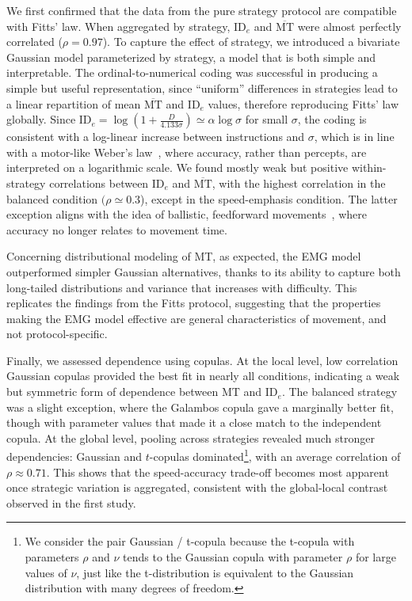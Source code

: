 \documentclass[acmlarge, manuscript,review]{acmart}
\newcommand{\mmt}{\ensuremath{\overline{\mt}}\xspace}
\newcommand{\mt}{\ensuremath{{\text{MT}}}\xspace}
\newcommand{\ide}{\ensuremath{{\text{ID}_e}}\xspace}
\begin{document}
We first confirmed that the data from the pure strategy protocol are compatible with Fitts' law. When aggregated by strategy, \ide and \mmt were almost perfectly correlated ($\rho = 0.97$). To capture the effect of strategy, we introduced a bivariate Gaussian model parameterized by strategy, a model that is both simple and interpretable.  The ordinal-to-numerical coding was successful in producing a simple but useful representation, since ``uniform'' differences in strategies lead to a linear repartition of mean \mmt and \ide values, therefore reproducing Fitts' law globally. Since $\ide = \log(1 + \tfrac{D}{4.133\sigma}) \simeq \alpha \log \sigma$ for small $\sigma$, the coding is consistent with a log-linear increase between instructions and $\sigma$, which is in line with a motor-like Weber's law~\cite{kandel}, where accuracy, rather than percepts, are interpreted on a logarithmic scale.
We found mostly weak but positive within-strategy correlations between \ide and \mmt, with the highest correlation in the balanced condition $(\rho \simeq 0.3$), except in the speed-emphasis condition. The latter exception aligns with the idea of ballistic, feedforward movements~\cite{gan1988,crossman1957}, where accuracy no longer relates to movement time.

Concerning distributional modeling of MT, as expected, the EMG model outperformed simpler Gaussian alternatives, thanks to its ability to capture both long-tailed distributions and variance that increases with difficulty. This replicates the findings from the Fitts protocol, suggesting that the properties making the EMG model effective are general characteristics of movement, and not protocol-specific.

Finally, we assessed dependence using copulas. At the local level, low correlation Gaussian copulas provided the best fit in nearly all conditions, indicating a weak but symmetric form of dependence between MT and \ide. The balanced strategy was a slight exception, where the Galambos copula gave a marginally better fit, though with parameter values that made it a close match to the independent copula. At the global level, pooling across strategies revealed much stronger dependencies: Gaussian and $t$-copulas dominated\footnote{We consider the pair Gaussian / t-copula because the t-copula with parameters $\rho$ and $\nu$ tends to the Gaussian copula with parameter $\rho$ for large values of $\nu$, just like the t-distribution is equivalent to the Gaussian distribution with many degrees of freedom. %
}, with an average correlation of $\rho \approx 0.71$. This shows that the speed-accuracy trade-off becomes most apparent once strategic variation is aggregated, consistent with the global-local contrast observed in the first study.
\end{document}
